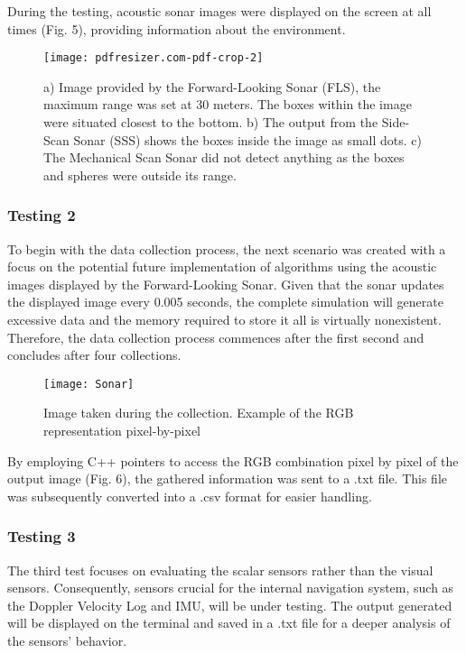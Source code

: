 \documentclass[]{article}
\begin{document}
	During the testing, acoustic sonar images were displayed on the screen at all times (Fig. 5), providing information about the environment.
	
	
	\begin{figure}[h]
		\begin{center}
			\texttt{[image: pdfresizer.com-pdf-crop-2]}
			\caption{a) Image provided by the Forward-Looking Sonar (FLS), the maximum range was set at 30 meters. The boxes within the image were situated closest to the bottom. b) The output from the Side-Scan Sonar (SSS) shows the boxes inside the image as small dots. c) The Mechanical Scan Sonar did not detect anything as the boxes and spheres were outside its range.}
		\end{center}	
	\end{figure}

	
	\subsubsection{Testing 2}
	
	To begin with the data collection process, the next scenario was created with a focus on the potential future implementation of algorithms using the acoustic images displayed by the Forward-Looking Sonar.  Given that the sonar updates the displayed image every 0.005 seconds, the complete simulation will generate excessive data and the memory required to store it all is virtually nonexistent. Therefore, the data collection process commences after the first second and concludes after four collections.
	
	\begin{figure}[h]
		\begin{center}
			\texttt{[image: Sonar]}
			\caption{Image taken during the collection. Example of the RGB representation pixel-by-pixel}
		\end{center}
	\end{figure}
	
	By employing C++ pointers to access the RGB combination pixel by pixel of the output image (Fig. 6), the gathered information was sent to a .txt file. This file was subsequently converted into a .csv format for easier handling.
	
	
	\subsubsection{Testing 3}
	
	The third test focuses on evaluating the scalar sensors rather than the visual sensors. Consequently, sensors crucial for the internal navigation system, such as the Doppler Velocity Log and IMU, will be under testing. The output generated will be displayed on the terminal and saved in a .txt file for a deeper analysis of the sensors' behavior.
	
\end{document}
